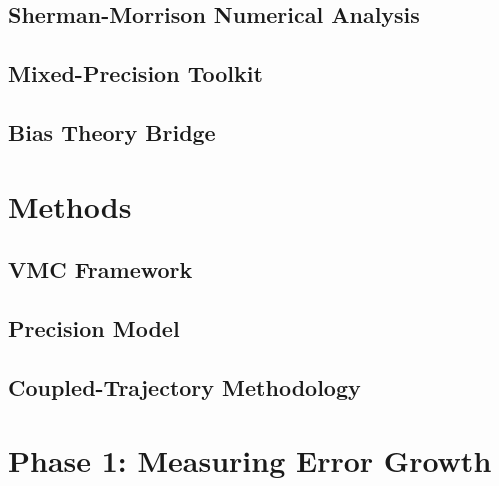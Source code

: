 \documentclass[conference]{IEEEtran}
\begin{document}
\subsection{Sherman-Morrison Numerical Analysis}

\subsection{Mixed-Precision Toolkit}

\subsection{Bias Theory Bridge}

\section{Methods}

\subsection{VMC Framework}

\subsection{Precision Model}

\subsection{Coupled-Trajectory Methodology}

\section{Phase 1: Measuring Error Growth}
\end{document}
